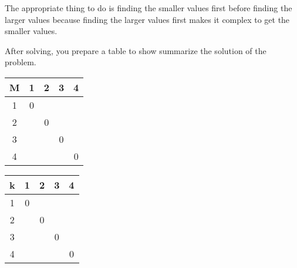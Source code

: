 \documentclass[12pt]{report}
\begin{document}
	The appropriate thing to do is finding the smaller values first before finding the larger values because finding the larger values first makes it complex to get the smaller values.
	
	After solving, you prepare a table to show summarize the solution of the problem.
	
	\begin{table}[h]
		\begin{tabular}{c|c|c|c|c|}
			M&1&2&3&4\\\hline
			1&0&&&\\\hline
			2&&0&&\\\hline
			3&&&0&\\\hline
			4&&&&0\\\hline
		\end{tabular}
		\qquad
		\begin{tabular}{c|c|c|c|c|}
			k&1&2&3&4\\\hline
			1&0&&&\\\hline
			2&&0&&\\\hline
			3&&&0&\\\hline
			4&&&&0\\\hline
		\end{tabular}
	\end{table}
	
\end{document}
